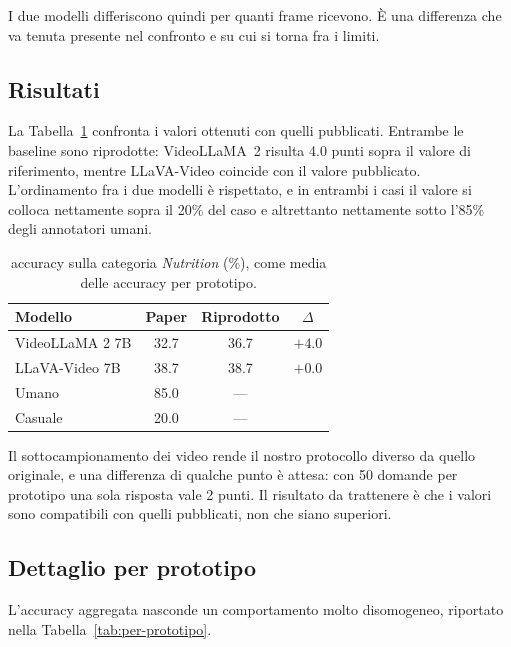 \documentclass{article}
\begin{document}
I due modelli differiscono quindi per quanti frame ricevono. È una
differenza che va tenuta presente nel confronto e su cui si torna fra i limiti.

\subsection{Risultati}

La Tabella~\ref{tab:baseline} confronta i valori ottenuti con quelli pubblicati.
Entrambe le baseline sono riprodotte: VideoLLaMA~2 risulta 4.0 punti sopra il
valore di riferimento, mentre LLaVA-Video coincide con il valore pubblicato. L'ordinamento fra i due
modelli è rispettato, e in entrambi i casi il valore si colloca nettamente sopra
il 20\% del caso e altrettanto nettamente sotto l'85\% degli annotatori umani.

\begin{table}[htbp]
\centering
\small
\begin{tabular}{@{}lccc@{}}
\toprule
Modello & Paper & Riprodotto & $\Delta$ \\
\midrule
VideoLLaMA 2 7B & 32.7 & 36.7 & $+4.0$ \\
LLaVA-Video 7B  & 38.7 & 38.7 & $+0.0$ \\
\midrule
Umano           & 85.0 & --- & \\
Casuale         & 20.0 & --- & \\
\bottomrule
\end{tabular}
\caption{accuracy sulla categoria \emph{Nutrition} (\%), come media delle
accuracy per prototipo.}
\label{tab:baseline}
\end{table}

Il sottocampionamento dei video rende il nostro protocollo diverso da quello
originale, e una differenza di qualche punto è attesa: con 50 domande per
prototipo una sola risposta vale 2 punti. Il risultato da trattenere è che i
valori sono compatibili con quelli pubblicati, non che siano superiori.

\subsection{Dettaglio per prototipo}

L'accuracy aggregata nasconde un comportamento molto disomogeneo, riportato
nella Tabella~\ref{tab:per-prototipo}.
\end{document}
